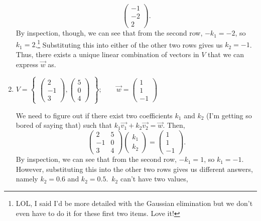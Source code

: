 \documentclass{article}
\begin{document}
\begin{enumerate}
\begin{solution}
\[\begin{pmatrix}
                -1\\-2\\2
            \end{pmatrix}.
        \] By inspection, though, we can see that from the second row, \(-k_1 = -2\), so \(k_1 = 2\).\footnote{LOL, I said I'd be more detailed with the Gaussian elimination but we don't even have to do it for these first two items. Love it!} Substituting this into either of the other two rows gives us \(k_2 = -1\). Thus, there exists a unique linear combination of vectors in \(V\) that 
        we can express \(\overrightarrow{w}\) as. 
    \end{solution}
    \item \(V = \begin{Bmatrix}
        \begin{pmatrix}
            2\\-1\\3
        \end{pmatrix},\begin{pmatrix}
            5\\0\\4
        \end{pmatrix}
    \end{Bmatrix}; \qquad \overrightarrow{w} = \begin{pmatrix}
        1\\1\\-1
    \end{pmatrix}\)\begin{solution}
        We need to figure out if there exist two coefficients \(k_1\) and \(k_2\) (I'm getting so bored of saying that) such that \(k_1\overrightarrow{v_1} + k_2\overrightarrow{v_2} = \overrightarrow{w}\). Then, \[
            \begin{pmatrix}
                2&5\\-1&0\\3&4
            \end{pmatrix}\begin{pmatrix}
                k_1\\k_2
            \end{pmatrix} = \begin{pmatrix}
                1\\1\\-1
            \end{pmatrix}.
        \] By inspection, we can see that from the second row, \(-k_1 = 1\), so \(k_1 = -1\). However, substituting this into the other two rows gives us different answers, namely \(k_2 = 0.6\) and \(k_2 = 0.5\).\ \(k_2\) can't have two values, 

\end{solution}
\end{enumerate}
\end{document}
